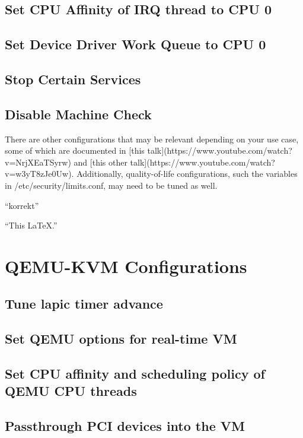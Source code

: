 \documentclass[MMR,Master,english]{twbook}
\begin{document}
\subsection{Set CPU Affinity of IRQ thread to CPU 0}


\subsection{Set Device Driver Work Queue to CPU 0}



\subsection{Stop Certain Services}

\subsection{Disable Machine Check}

There are other configurations that may be relevant depending on your use case, some of which are documented in [this talk](https://www.youtube.com/watch?v=NrjXEaTSyrw) and [this other talk](https://www.youtube.com/watch?v=w3yT8zJe0Uw). Additionally, quality-of-life configurations, such the variables in /etc/security/limits.conf, may need to be tuned as well.



``korrekt''

\enquote{This LaTeX.}



\clearpage

\section{QEMU-KVM Configurations}\label{sec:guest_configurations}
\subsection{Tune lapic timer advance}
\subsection{Set QEMU options for real-time VM}
\subsection{Set CPU affinity and scheduling policy of QEMU CPU threads}
\subsection{Passthrough PCI devices into the VM}
\end{document}
